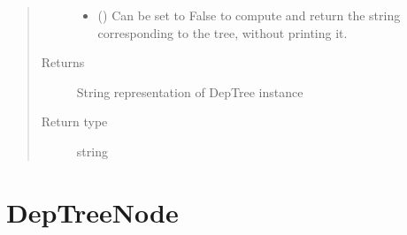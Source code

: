 \documentclass[letterpaper,10pt,english]{sphinxmanual}
\begin{document}
\begin{fulllineitems}
\begin{fulllineitems}
\begin{quote}
\begin{description}
\begin{itemize}
\item {} 
 () \textendash{} Can be set to False to compute and return the string corresponding to the tree, without
printing it.

\end{itemize}

\item[{Returns}] \leavevmode
String representation of DepTree instance

\item[{Return type}] \leavevmode
string

\end{description}\end{quote}

\end{fulllineitems}


\end{fulllineitems}



\section{DepTreeNode}
\label{\detokenize{index:deptreenode}}
\end{document}
